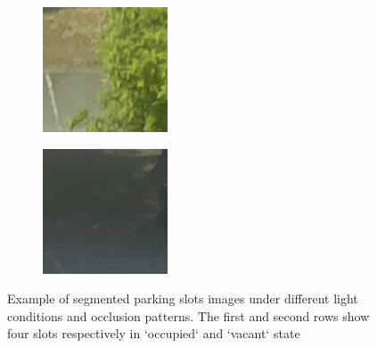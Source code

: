 \begin{figure}
\begin{subfigure}{0.25\columnwidth}
\end{subfigure}%
\begin{subfigure}{0.25\columnwidth}%
\includegraphics[width=\columnwidth]{11empty}%
\end{subfigure}%
\begin{subfigure}{0.25\columnwidth}%
\includegraphics[width=\columnwidth]{13empty}%
\end{subfigure}
\caption{Example of segmented parking slots images under different light conditions and occlusion patterns.
The first and second rows show four slots respectively in `occupied` and `vacant` state}
\label{fig:mini:slots}
\end{figure}

